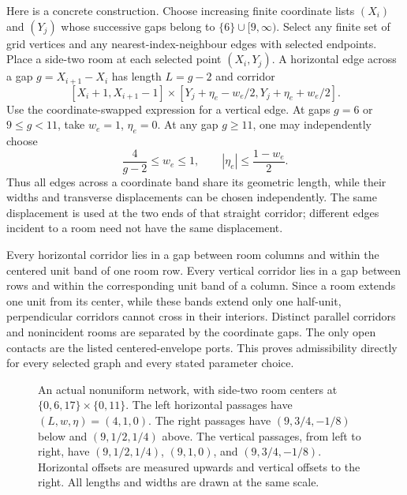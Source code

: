 \documentclass[11pt,reqno]{amsart}
\numberwithin{equation}{section}
\begin{document}
Here is a concrete construction. Choose increasing finite coordinate
lists $(X_i)$ and $(Y_j)$ whose successive gaps belong to
$\{6\}\cup[9,\infty)$. Select any finite set of grid vertices and any
nearest-index-neighbour edges with selected endpoints. Place a side-two
room at each selected point $(X_i,Y_j)$. A horizontal edge across a
gap $g=X_{i+1}-X_i$ has length $L=g-2$ and corridor
\[
 [X_i+1,X_{i+1}-1]\times
 [Y_j+\eta_e-w_e/2,Y_j+\eta_e+w_e/2].
\]
Use the coordinate-swapped expression for a vertical edge. At gaps
$g=6$ or $9\le g<11$, take $w_e=1$, $\eta_e=0$. At any gap $g\ge11$,
one may independently choose
\[
 \frac4{g-2}\le w_e\le1,\qquad
 |\eta_e|\le\frac{1-w_e}{2}.
\]
Thus all edges across a coordinate band share its geometric length,
while their widths and transverse displacements can be chosen
independently. The same displacement is used at the two ends of that
straight corridor; different edges incident to a room need not have
the same displacement.

Every horizontal corridor lies in a gap between room columns and within
the centered unit band of one room row. Every vertical corridor lies
in a gap between rows and within the corresponding unit band of a
column. Since a room extends one unit from its center, while these
bands extend only one half-unit, perpendicular corridors cannot cross
in their interiors. Distinct parallel corridors and nonincident rooms
are separated by the coordinate gaps. The only open contacts are the
listed centered-envelope ports. This proves admissibility directly for
every selected graph and every stated parameter choice.

\begin{figure}[tb]
\centering
{}
\caption{An actual nonuniform network, with side-two room centers
at $\{0,6,17\}\times\{0,11\}$. The left horizontal passages have
$(L,w,\eta)=(4,1,0)$. The right passages have $(9,3/4,-1/8)$ below
and $(9,1/2,1/4)$ above. The vertical passages, from left to right,
have $(9,1/2,1/4)$, $(9,1,0)$, and $(9,3/4,-1/8)$.
Horizontal offsets are measured upwards and vertical offsets to
the right. All lengths and widths are drawn at the same scale.}
\label{fig:nonuniform}
\end{figure}
\end{document}
